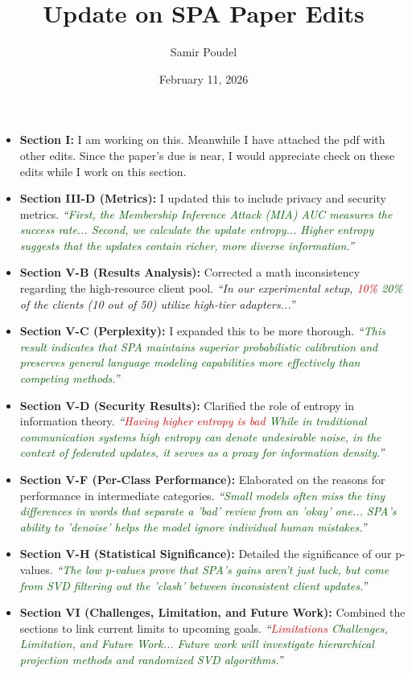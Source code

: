 \documentclass[11pt]{article}
\title{Update on SPA Paper Edits}
\author{Samir Poudel}
\date{February 11, 2026}
\begin{document}
\maketitle


\begin{itemize}
    \item \textbf{Section I:} I am working on this. Meanwhile I have attached the pdf with other edits. Since the paper's due is near, I would appreciate check on these edits while I work on this section.
    \item \textbf{Section III-D (Metrics):} I updated this to include privacy and security metrics. 
    \textit{``\textcolor{darkgreen}{First, the Membership Inference Attack (MIA) AUC measures the success rate... Second, we calculate the update entropy... Higher entropy suggests that the updates contain richer, more diverse information.}''}

    \item \textbf{Section V-B (Results Analysis):} Corrected a math inconsistency regarding the high-resource client pool. 
    \textit{``In our experimental setup, \textcolor{red}{10\%} \textcolor{darkgreen}{20\%} of the clients (10 out of 50) utilize high-tier adapters...''}

    \item \textbf{Section V-C (Perplexity):} I expanded this to be more thorough. 
    \textit{``\textcolor{darkgreen}{This result indicates that SPA maintains superior probabilistic calibration and preserves general language modeling capabilities more effectively than competing methods.}''}

    \item \textbf{Section V-D (Security Results):} Clarified the role of entropy in information theory. 
    \textit{``\textcolor{red}{Having higher entropy is bad} \textcolor{darkgreen}{While in traditional communication systems high entropy can denote undesirable noise, in the context of federated updates, it serves as a proxy for information density.}''}

    \item \textbf{Section V-F (Per-Class Performance):} Elaborated on the reasons for performance in intermediate categories. 
    \textit{``\textcolor{darkgreen}{Small models often miss the tiny differences in words that separate a 'bad' review from an 'okay' one... SPA's ability to 'denoise' helps the model ignore individual human mistakes.}''}

    \item \textbf{Section V-H (Statistical Significance):} Detailed the significance of our p-values. 
    \textit{``\textcolor{darkgreen}{The low p-values prove that SPA's gains aren't just luck, but come from SVD filtering out the 'clash' between inconsistent client updates.}''}

    \item \textbf{Section VI (Challenges, Limitation, and Future Work):} Combined the sections to link current limits to upcoming goals. 
    \textit{``\textcolor{red}{Limitations} \textcolor{darkgreen}{Challenges, Limitation, and Future Work... Future work will investigate hierarchical projection methods and randomized SVD algorithms.}''}
\end{itemize}
\end{document}
